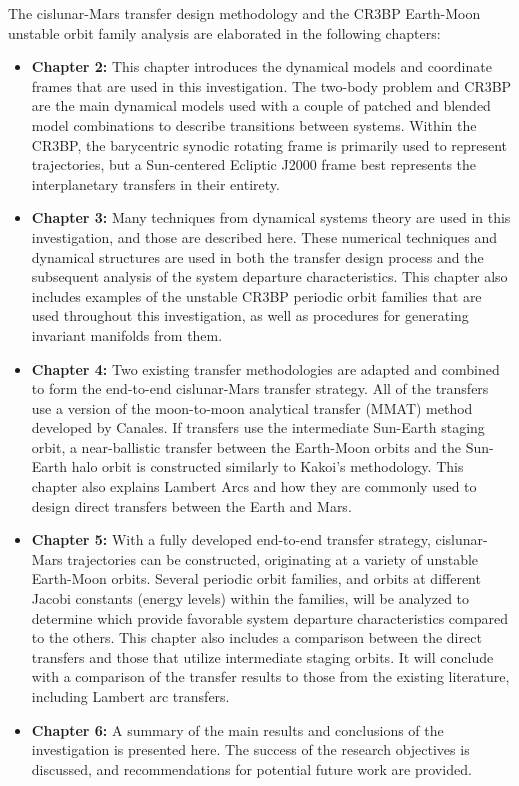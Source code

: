The cislunar-Mars transfer design methodology and the CR3BP Earth-Moon unstable orbit family
analysis are elaborated in the following chapters:
\begin{itemize}
	\item	\textbf{Chapter 2:} This chapter introduces the dynamical models and coordinate frames
			that are used in this investigation. The two-body problem and CR3BP are the main
			dynamical models used with a couple of patched and blended model combinations to
			describe transitions between systems. Within the CR3BP, the barycentric synodic
			rotating frame is primarily used to represent trajectories, but a Sun-centered Ecliptic
			J2000 frame best represents the interplanetary transfers in their entirety.
	\item	\textbf{Chapter 3:} Many techniques from dynamical systems theory are used in this
			investigation, and those are described here. These numerical techniques and dynamical
			structures are used in both the transfer design process and the subsequent analysis of
			the system departure characteristics. This chapter also includes examples of the
			unstable CR3BP periodic orbit families that are used throughout this investigation, as
			well as procedures for generating invariant manifolds from them.
	\item	\textbf{Chapter 4:} Two existing transfer methodologies are adapted and combined to
			form the end-to-end cislunar-Mars transfer strategy. All of the transfers use a version
			of the moon-to-moon analytical transfer (MMAT) method developed by
			Canales\cite{Canales:2021b}. If transfers use the intermediate Sun-Earth staging orbit,
			a near-ballistic transfer between the Earth-Moon orbits and the Sun-Earth halo orbit is
			constructed similarly to Kakoi's methodology\cite{Kakoi:2015}. This chapter also explains
			Lambert Arcs and how they are commonly used to design direct transfers between the
			Earth and Mars.
	\item	\textbf{Chapter 5:} With a fully developed end-to-end transfer strategy, cislunar-Mars
			trajectories can be constructed, originating at a variety of unstable Earth-Moon
			orbits. Several periodic orbit families, and orbits at different Jacobi constants
			(energy levels) within the families, will be analyzed to determine which provide
			favorable system departure characteristics compared to the others. This chapter also
			includes a comparison between the direct transfers and those that utilize intermediate
			staging orbits. It will conclude with a comparison of the transfer results to those
			from the existing literature, including Lambert arc transfers.
	\item	\textbf{Chapter 6:} A summary of the main results and conclusions of the investigation
			is presented here. The success of the research objectives is discussed, and
			recommendations for potential future work are provided.
\end{itemize}
